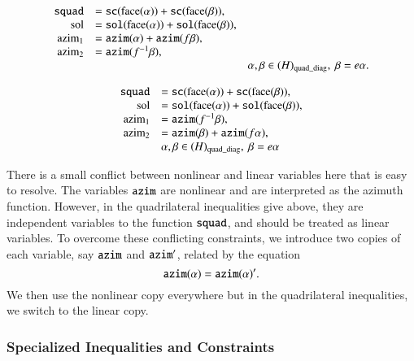 \begin{equation}
\begin{array}{rll}
    {\operatorname{{\texttt{squad}}}} &={\operatorname{{\texttt{sc}}}}({\operatorname{face}}(\alpha))+{\operatorname{{\texttt{sc}}}}({\operatorname{face}}(\beta)),\\
    {\operatorname{sol}} &= {\operatorname{{\texttt{sol}}}}({\operatorname{face}}(\alpha))+{\operatorname{{\texttt{sol}}}}({\operatorname{face}}(\beta)),\\
    {\operatorname{azim}}_1 &={\operatorname{{\texttt{azim}}}}(\alpha)+{\operatorname{{\texttt{azim}}}}(f\beta),\\
     {\operatorname{azim}}_2 &= {\operatorname{{\texttt{azim}}}}(f^{-1}\beta),
         \\
    &&\alpha,\beta \in (H)_{{\operatorname{quad\_diag}}},\ \beta=e\alpha.\\
\end{array}
\end{equation}

\begin{equation}
\begin{array}{rll}
    {\operatorname{{\texttt{squad}}}} &={\operatorname{{\texttt{sc}}}}({\operatorname{face}}(\alpha))+{\operatorname{{\texttt{sc}}}}({\operatorname{face}}(\beta)),\\
    {\operatorname{sol}} &= {\operatorname{{\texttt{sol}}}}({\operatorname{face}}(\alpha))+{\operatorname{{\texttt{sol}}}}({\operatorname{face}}(\beta)),\\
    {\operatorname{azim}}_1 &={\operatorname{{\texttt{azim}}}}(f^{-1}\beta),\\
     {\operatorname{azim}}_2 &= {\operatorname{{\texttt{azim}}}}(\beta)+{\operatorname{{\texttt{azim}}}}(f\alpha),
         \\
    &\alpha,\beta \in (H)_{{\operatorname{quad\_diag}}},\ \beta=e\alpha\\
\end{array}
\end{equation}

\begin{remark}  There is a small conflict between nonlinear and
linear variables here that is easy to resolve.  The variables
${\operatorname{{\texttt{azim}}}}$ are nonlinear and are interpreted as the azimuth
function.  However, in the quadrilateral inequalities give above,
they are independent variables to the function ${\operatorname{{\texttt{squad}}}}$, and
should be treated as linear variables.  To overcome these
conflicting constraints, we introduce two copies of each variable,
say ${\operatorname{{\texttt{azim}}}}$ and ${\operatorname{{\texttt{azim}}}}'$, related by the equation
    $$
    {\operatorname{{\texttt{azim}}}}(\alpha) = {\operatorname{{\texttt{azim}}}}(\alpha)'.
    $$
We then use the nonlinear copy everywhere but in the quadrilateral
inequalities, we switch to the linear copy.
\end{remark}

\subsubsection{Specialized Inequalities and Constraints}




